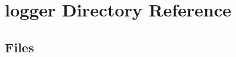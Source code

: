 \section{logger Directory Reference}
\label{dir_e546037d539dab48998ac54ab76cb525}
\subsection*{Files}
\begin{DoxyCompactItemize}
\end{DoxyCompactItemize}

